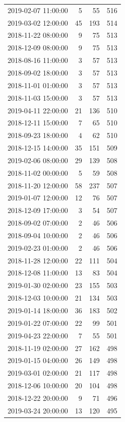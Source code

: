 \begin{tabular}{lrrr}
2019-02-07 11:00:00 & 5 & 55 & 516 \\
2019-03-02 12:00:00 & 45 & 193 & 514 \\
2018-11-22 08:00:00 & 9 & 75 & 513 \\
2018-12-09 08:00:00 & 9 & 75 & 513 \\
2018-08-16 11:00:00 & 3 & 57 & 513 \\
2018-09-02 18:00:00 & 3 & 57 & 513 \\
2018-11-01 01:00:00 & 3 & 57 & 513 \\
2018-11-03 15:00:00 & 3 & 57 & 513 \\
2019-04-11 22:00:00 & 21 & 136 & 510 \\
2018-12-11 15:00:00 & 7 & 65 & 510 \\
2018-09-23 18:00:00 & 4 & 62 & 510 \\
2018-12-15 14:00:00 & 35 & 151 & 509 \\
2019-02-06 08:00:00 & 29 & 139 & 508 \\
2018-11-02 00:00:00 & 5 & 59 & 508 \\
2018-11-20 12:00:00 & 58 & 237 & 507 \\
2019-01-07 12:00:00 & 12 & 76 & 507 \\
2018-12-09 17:00:00 & 3 & 54 & 507 \\
2018-09-02 07:00:00 & 2 & 46 & 506 \\
2018-09-04 10:00:00 & 2 & 46 & 506 \\
2019-02-23 01:00:00 & 2 & 46 & 506 \\
2018-11-28 12:00:00 & 22 & 111 & 504 \\
2018-12-08 11:00:00 & 13 & 83 & 504 \\
2019-01-30 02:00:00 & 23 & 155 & 503 \\
2018-12-03 10:00:00 & 21 & 134 & 503 \\
2019-01-14 18:00:00 & 36 & 183 & 502 \\
2019-01-22 07:00:00 & 22 & 99 & 501 \\
2019-04-23 22:00:00 & 7 & 55 & 501 \\
2018-11-19 02:00:00 & 27 & 162 & 498 \\
2019-01-15 04:00:00 & 26 & 149 & 498 \\
2019-03-01 02:00:00 & 21 & 117 & 498 \\
2018-12-06 10:00:00 & 20 & 104 & 498 \\
2018-12-22 20:00:00 & 9 & 71 & 496 \\
2019-03-24 20:00:00 & 13 & 120 & 495 \\

\end{tabular}
